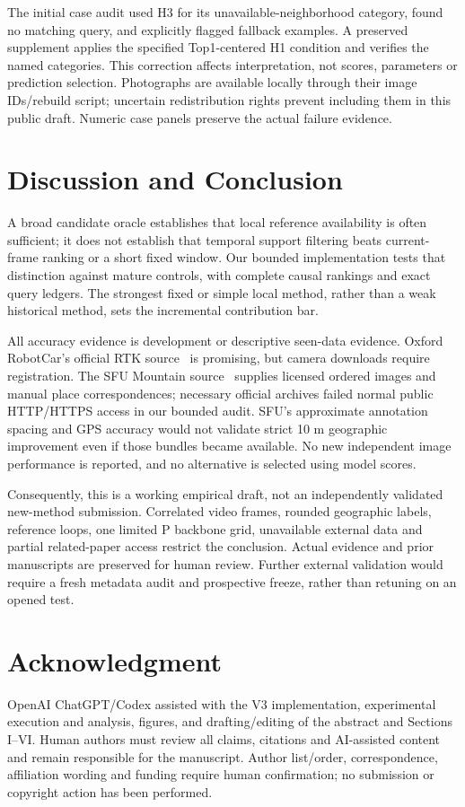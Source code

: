 \documentclass[conference]{IEEEtran}
\begin{document}
The initial case audit used H3 for its unavailable-neighborhood category, found no matching query, and explicitly flagged fallback examples. A preserved supplement applies the specified Top1-centered H1 condition and verifies the named categories. This correction affects interpretation, not scores, parameters or prediction selection. Photographs are available locally through their image IDs/rebuild script; uncertain redistribution rights prevent including them in this public draft. Numeric case panels preserve the actual failure evidence.



\section{Discussion and Conclusion}
A broad candidate oracle establishes that local reference availability is often sufficient; it does not establish that temporal support filtering beats current-frame ranking or a short fixed window. Our bounded implementation tests that distinction against mature controls, with complete causal rankings and exact query ledgers. The strongest fixed or simple local method, rather than a weak historical method, sets the incremental contribution bar.

All accuracy evidence is development or descriptive seen-data evidence. Oxford RobotCar's official RTK source~\cite{robotcar} is promising, but camera downloads require registration. The SFU Mountain source~\cite{sfu} supplies licensed ordered images and manual place correspondences; necessary official archives failed normal public HTTP/HTTPS access in our bounded audit. SFU's approximate annotation spacing and GPS accuracy would not validate strict 10 m geographic improvement even if those bundles became available. No new independent image performance is reported, and no alternative is selected using model scores.

Consequently, this is a working empirical draft, not an independently validated new-method submission. Correlated video frames, rounded geographic labels, reference loops, one limited P backbone grid, unavailable external data and partial related-paper access restrict the conclusion. Actual evidence and prior manuscripts are preserved for human review. Further external validation would require a fresh metadata audit and prospective freeze, rather than retuning on an opened test.

\section*{Acknowledgment}
OpenAI ChatGPT/Codex assisted with the V3 implementation, experimental execution and analysis, figures, and drafting/editing of the abstract and Sections I--VI. Human authors must review all claims, citations and AI-assisted content and remain responsible for the manuscript. Author list/order, correspondence, affiliation wording and funding require human confirmation; no submission or copyright action has been performed.
\end{document}

